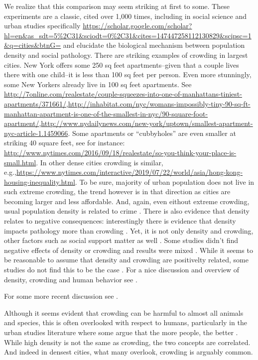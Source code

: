 \documentclass[10pt, letterpaper]{article}
\begin{document}
\begin{spacing}{1.4}
{We realize that this comparison may seem striking at
  first to some. These experiments are a classic, cited over 1,000 times,
  including in social science and urban studies specifically
  \url{https://scholar.google.com/scholar?hl=en&as_sdt=5\%2C31&sciodt=0\%2C31&cites=147447258112130829&scipsc=1&q=cities&btnG=}
  and elucidate the biological mechanism between population density and social
  pathology.  There are striking examples of crowding in largest cities. New
  York offers some 250 sq feet apartments--given that a couple lives there with
  one child--it is less than 100 sq feet per person. Even more stunningly, some
  New Yorkers already live in 100 sq feet apartments. See
  \url{http://7online.com/realestate/couple-squeezes-into-one-of-manhattans-tiniest-apartments/371661/},\url{http://inhabitat.com/nyc/womans-impossibly-tiny-90-sq-ft-manhattan-apartment-is-one-of-the-smallest-in-nyc/90-square-foot-apartment/},\url{http://www.nydailynews.com/new-york/uptown/smallest-apartment-nyc-article-1.1459066}. Some
  apartments or ``cubbyholes'' are even smaller at striking 40 square feet, see
  for instance:
  \url{http://www.nytimes.com/2016/09/18/realestate/so-you-think-your-place-is-small.html}. In
  other dense cities crowding is similar,
  e.g.,\url{https://www.nytimes.com/interactive/2019/07/22/world/asia/hong-kong-housing-inequality.html}. To
  be sure, majority of urban population does not live in such extreme crowding,
  the trend however is in that direction as cities are becoming larger and less
  affordable. And, again, even eithout extreme crowding, usual population
  density is related to crime \citep{bettencourt10b}. There is also evidence
  that density relates to negative consequences: interestingly there is evidence
  that density impacts pathology more than crowding
  \citep{levy1974effects}. Yet, it is not only density and crowding, other
  factors such as social support matter as well \citep{cassel2017health}. Some
  studies didn't find negative effects of density or crowding and results were
  mixed \citep{collette1976urban}. While it seems to be reasonable to assume
  that density and crowding are positivelty related, some studies do not find
  this to be the case \citep{webb1975meaning,rodgers1982density}.
  For a nice discussion and overview of density, crowding and human behavior see \citet{boots1979population,choldin1978urban}. 
}

For some more recent   discussion see \citet{ramsden09}. %

 Although it seems
 evident that crowding can be harmful to almost all animals and species, this is
 often overlooked with respect to humans, particularly in the urban studies
 literature where some argue that the more people, the better
 \citep[e.g.,][]{glaeser11}. While high density is not the same as crowding, the
 two concepts are correlated. And indeed in densest cities, what many overlook,
 crowding is arguably  common.

 
\end{spacing}
\end{document}
